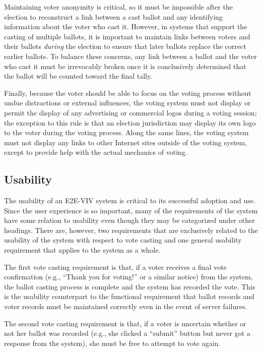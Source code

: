 Maintaining voter anonymity is critical, so it must be impossible
after the election to reconstruct a link between a cast ballot and any
identifying information about the voter who cast it. However, in
systems that support the casting of multiple ballots, it is important
to maintain links between voters and their ballots \emph{during} the
election to ensure that later ballots replace the correct earlier
ballots. To balance these concerns, any link between a ballot and the
voter who cast it must be irrevocably broken once it is conclusively
determined that the ballot will be counted toward the final tally.

Finally, because the voter should be able to focus on the voting
process without undue distractions or external influences, the voting
system must not display or permit the display of any advertising or
commercial logos during a voting session; the exception to this rule
is that an election jurisdiction may display its own logo to the voter
during the voting process. Along the same lines, the voting system
must not display any links to other Internet sites outside of the
voting system, except to provide help with the actual mechanics of
voting.

\subsection{Usability}

The usability of an E2E-VIV system is critical to its successful
adoption and use. Since the user experience is so important, many of
the requirements of the system have some relation to usability even
though they may be categorized under other headings. There are,
however, two requirements that are exclusively related to the
usability of the system with respect to vote casting and one general
usability requirement that applies to the system as a whole.

The first vote casting requirement is that, if a voter receives a
final vote confirmation (e.g., ``Thank you for voting!'' or a similar
notice) from the system, the ballot casting process is complete and
the system has recorded the vote.  This is the usability counterpart
to the functional requirement that ballot records and voter records
must be maintained correctly even in the event of server failures.

The second vote casting requirement is that, if a voter is uncertain
whether or not her ballot was recorded (e.g., she clicked a ``submit''
button but never got a response from the system), she must be free
to attempt to vote again.

